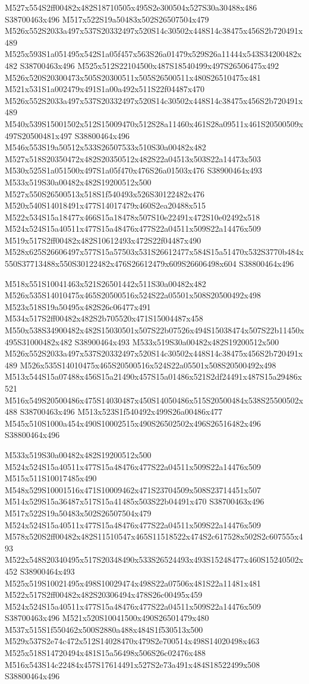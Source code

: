 \documentclass{article}
\begin{document}
\begin{multicols}{2}
M527x554S2ff00482x482S18710505x495S2e300504x527S30a30488x486 S38700463x496 M517x522S19a50483x502S26507504x479 M526x552S2033a497x537S20332497x520S14c30502x448S14c38475x456S2b720491x489 M525x593S1a051495x542S1a05f457x563S26a01479x529S26a11444x543S34200482x482 S38700463x496 M525x512S22104500x487S18540499x497S26506475x492 M526x520S20300473x505S20300511x505S26500511x480S26510475x481 M521x531S1a002479x491S1a00a492x511S22f04487x470 M526x552S2033a497x537S20332497x520S14c30502x448S14c38475x456S2b720491x489 M540x539S15001502x512S15009470x512S28a11460x461S28a09511x461S20500509x497S20500481x497 S38800464x496 M546x553S19a50512x533S26507533x510S30a00482x482 M527x518S20350472x482S20350512x482S22a04513x503S22a14473x503 M530x525S1a051500x497S1a05f470x476S26a01503x476 S38900464x493 M533x519S30a00482x482S19200512x500 M527x550S26500513x518S1f540493x526S30122482x476 M520x540S14018491x477S14017479x460S2ea20488x515 M522x534S15a18477x466S15a18478x507S10e22491x472S10e02492x518 M524x524S15a40511x477S15a48476x477S22a04511x509S22a14476x509 M519x517S2ff00482x482S10612493x472S22f04487x490 M528x625S26606497x577S15a57503x531S26612477x584S15a51470x532S3770b484x550S37713488x550S30122482x476S26612479x609S26606498x604 S38800464x496

M518x551S10041463x521S26501442x511S30a00482x482 M526x535S14010475x465S20500516x524S22a05501x508S20500492x498 M523x518S19a50495x482S26c06477x491 M534x517S2ff00482x482S2b705520x471S15004487x458 M550x538S34900482x482S15030501x507S22b07526x494S15038474x507S22b11450x495S31000482x482 S38900464x493 M533x519S30a00482x482S19200512x500 M526x552S2033a497x537S20332497x520S14c30502x448S14c38475x456S2b720491x489 M526x535S14010475x465S20500516x524S22a05501x508S20500492x498 M513x544S15a07488x456S15a21490x457S15a01486x521S2df24491x487S15a29486x521 M516x549S20500486x475S14030487x450S14050486x515S20500484x538S25500502x488 S38700463x496 M513x523S1f540492x499S26a00486x477 M545x510S1000a454x490S10002515x490S26502502x496S26516482x496 S38800464x496

M533x519S30a00482x482S19200512x500 M524x524S15a40511x477S15a48476x477S22a04511x509S22a14476x509 M515x511S10017485x490 M548x529S10001516x471S10009462x471S23704509x508S23714451x507 M514x529S15a36487x517S15a41485x503S22b04491x470 S38700463x496 M517x522S19a50483x502S26507504x479 M524x524S15a40511x477S15a48476x477S22a04511x509S22a14476x509 M578x520S2ff00482x482S11510547x465S11518522x474S2c617528x502S2c607555x493 M522x548S20340495x517S20348490x533S26524493x493S15248477x460S15240502x452 S38900464x493 M525x519S10021495x498S10029474x498S22a07506x481S22a11481x481 M522x517S2ff00482x482S20306494x478S26c00495x459 M524x524S15a40511x477S15a48476x477S22a04511x509S22a14476x509 S38700463x496 M521x520S10041500x490S26501479x480 M537x515S1f550462x500S2880a488x484S1f530513x500 M529x537S2e74c472x512S14028470x479S2e700514x498S14020498x463 M525x518S14720494x481S15a56498x506S26c02476x488 M516x543S14c22484x457S17614491x527S2e73a491x484S18522499x508 S38800464x496


\end{multicols}
\end{document}
